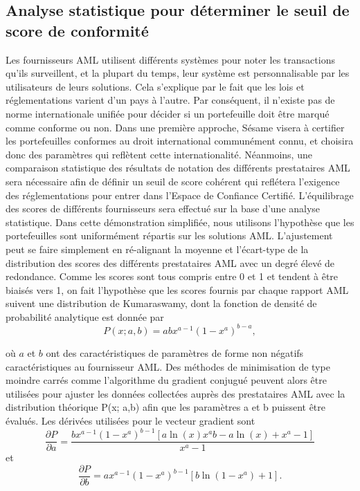 ﻿\documentclass[a4paper]{article}
\let\OldTexttrademark\texttrademark
\renewcommand{\texttrademark}{\OldTexttrademark\xspace}%
\begin{document}
\subsection{Analyse statistique pour déterminer le  seuil de score de conformité}
Les fournisseurs AML utilisent différents systèmes pour noter les transactions qu'ils surveillent, et la plupart du temps, leur système est personnalisable par les utilisateurs de leurs solutions. Cela s'explique par le fait que les lois et réglementations varient d'un pays à l'autre. Par conséquent, il n'existe pas de norme internationale unifiée pour décider si un portefeuille doit être marqué comme conforme ou non.
Dans une première approche, Sésame visera à certifier les portefeuilles conformes au droit international communément connu, et choisira donc des paramètres qui reflètent cette internationalité.
Néanmoins, une comparaison statistique des résultats de notation des différents prestataires AML sera nécessaire afin de définir un seuil de score cohérent qui reflétera l'exigence des réglementations pour entrer dans l'Espace de Confiance Certifié\OldTexttrademark. L'équilibrage des scores de différents fournisseurs sera effectué sur la base d'une analyse statistique. Dans cette démonstration simplifiée, nous utilisons l'hypothèse que les portefeuilles sont uniformément répartis sur les solutions AML. L'ajustement peut se faire simplement en ré-alignant la moyenne et l'écart-type de la distribution des scores des différents prestataires AML avec un degré élevé de redondance.
Comme les scores sont tous compris entre 0 et 1 et tendent à être biaisés vers 1, on fait l'hypothèse que les scores fournis par chaque rapport AML suivent une distribution de Kumaraswamy, dont la fonction de densité de probabilité analytique est donnée par
$$P(x; a,b)=abx^{a-1}\left(1-x^a\right)^{b-a},$$  

\noindent où $a$ et $b$ ont des caractéristiques de paramètres de forme non négatifs caractéristiques au fournisseur AML.
Des méthodes de minimisation de type moindre carrés comme l'algorithme du gradient conjugué peuvent alors être utilisées pour ajuster les données collectées auprès des prestataires AML avec la distribution théorique P(x; a,b) afin que les paramètres a et b puissent être évalués.
Les dérivées utilisées pour le vecteur gradient sont$$\frac{\partial P}{\partial a}=\frac{bx^{a-1}\left(1-x^a\right)^{b-1}\left[a\ln(x)x^ab
-a\ln(x)+x^a-1\right]}{x^a-1}$$
et 
$$\frac{\partial P}{\partial b}=ax^{a-1}\left(1-x^a\right)^{b-1}\left[b\ln(1-x^a)+1\right].$$
\end{document}
